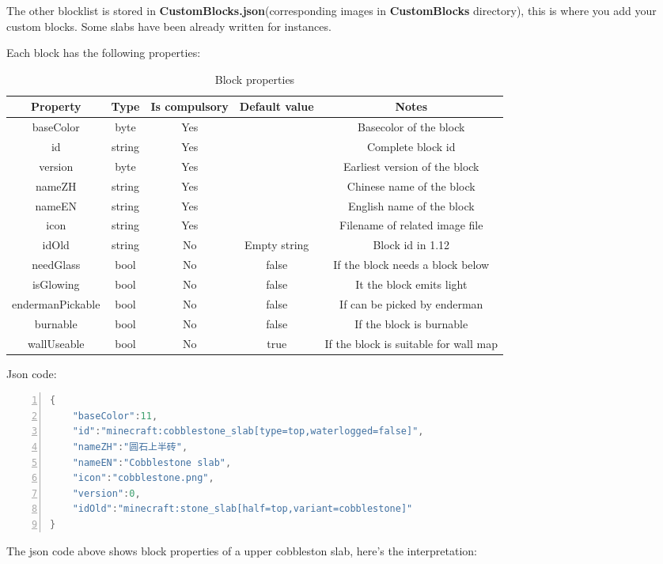 \documentclass{article}
\begin{document}
   The other blocklist is stored in \textbf{CustomBlocks.json}(corresponding images in \textbf{CustomBlocks} directory), this is where you add your custom blocks. Some slabs have been already written for instances.
   
   Each block has the following properties:
   \begin{table}[h]
    \centering
    \caption{Block properties}
    \begin{tabular}{ccccc}
        \hline
        Property & Type & Is compulsory & Default value & Notes  \\ \hline
        baseColor & byte & Yes & & Basecolor of the block \\
        id & string & Yes & & Complete block id\\
        version & byte & Yes & & Earliest version of the block \\
        nameZH & string & Yes & & Chinese name of the block \\
        nameEN & string & Yes & & English name of the block \\
        icon & string & Yes & & Filename of related image file \\
        idOld & string & No & Empty string & Block id in 1.12 \\
        needGlass & bool & No & false & If the block needs a block below \\
        isGlowing & bool & No & false & It the block emits light \\
        endermanPickable & bool & No & false & If can be picked by enderman \\
        burnable & bool & No & false & If the block is burnable \\
        wallUseable & bool & No & true & If the block is suitable for wall map \\
        \hline 
    \end{tabular}       
   \end{table}
   
   \clearpage
   Json code:
\begin{lstlisting}[language = C++, numbers=left, 
    numberstyle=\tiny,keywordstyle=\color{blue!70},
    commentstyle=\color{red!50!green!50!blue!50},frame=shadowbox,
    rulesepcolor=\color{red!20!green!20!blue!20},basicstyle=\ttfamily]
{
    "baseColor":11,
    "id":"minecraft:cobblestone_slab[type=top,waterlogged=false]",
    "nameZH":"圆石上半砖",
    "nameEN":"Cobblestone slab",
    "icon":"cobblestone.png",
    "version":0,
    "idOld":"minecraft:stone_slab[half=top,variant=cobblestone]"
}
    \end{lstlisting}
    The json code above shows block properties of a upper cobbleston slab, here's the interpretation:
\end{document}
